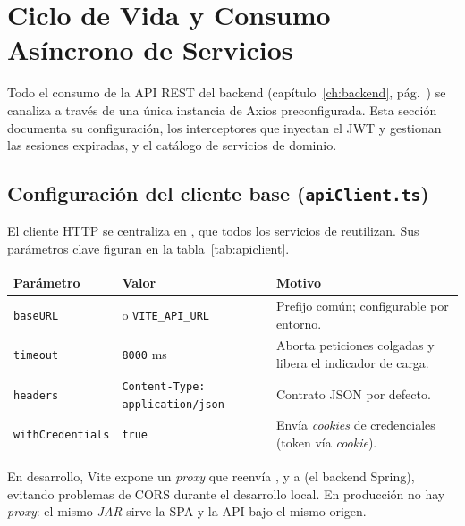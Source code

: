 \section{Ciclo de Vida y Consumo Asíncrono de Servicios}
\label{sec:servicios}

Todo el consumo de la API REST del backend (capítulo~\ref{ch:backend},
pág.~\pageref{ch:backend}) se canaliza a través de una única instancia de Axios
preconfigurada. Esta sección documenta su configuración, los interceptores que inyectan el
JWT y gestionan las sesiones expiradas, y el catálogo de servicios de dominio.

\subsection{Configuración del cliente base (\texttt{apiClient.ts})}
\label{subsec:apiclient}

El cliente HTTP se centraliza en , que todos los servicios de
 reutilizan. Sus parámetros clave figuran en la
tabla~\ref{tab:apiclient}.

\vspace{0.2cm}
\noindent
\renewcommand{\arraystretch}{1.3}
\fontsize{8.5}{10.2}\selectfont\sffamily
\begin{tabularx}{\textwidth}{|L{3.4cm}|L{3.2cm}|Y|}
\hline
{}
\sffamily\textbf{Parámetro} & \sffamily\textbf{Valor} & \sffamily\textbf{Motivo} \\
\hline
\texttt{baseURL} &  o \texttt{VITE\_API\_URL} & Prefijo común; configurable por entorno. \\ \hline
{}
\texttt{timeout} & \texttt{8000} ms & Aborta peticiones colgadas y libera el indicador de carga. \\ \hline
\texttt{headers} & \texttt{Content-Type: application/json} & Contrato JSON por defecto. \\ \hline
{}
\texttt{withCredentials} & \texttt{true} & Envía \textit{cookies} de credenciales (token vía \textit{cookie}). \\ \hline
\end{tabularx}
\label{tab:apiclient}

\begin{NotaTecnica}
En desarrollo, Vite expone un \textit{proxy} que reenvía , 
y  a  (el backend Spring), evitando
problemas de CORS durante el desarrollo local. En producción no hay \textit{proxy}: el
mismo \textit{JAR} sirve la SPA y la API bajo el mismo origen.
\end{NotaTecnica}

